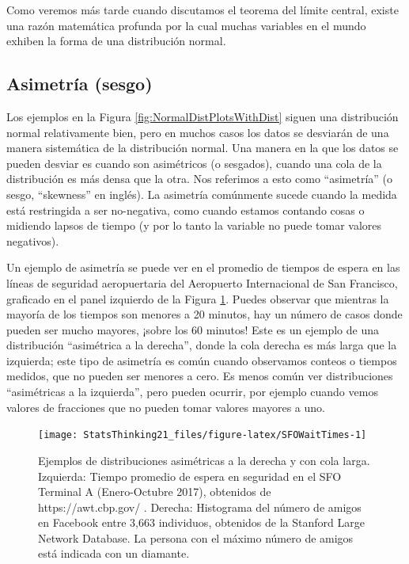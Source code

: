 \documentclass[
  12pt,
]{book}
\begin{document}
Como veremos más tarde cuando discutamos el teorema del límite central, existe una razón matemática profunda por la cual muchas variables en el mundo exhiben la forma de una distribución normal.

\hypertarget{asimetruxeda-sesgo}{%
\subsection{Asimetría (sesgo)}\label{asimetruxeda-sesgo}}

Los ejemplos en la Figura \ref{fig:NormalDistPlotsWithDist} siguen una distribución normal relativamente bien, pero en muchos casos los datos se desviarán de una manera sistemática de la distribución normal. Una manera en la que los datos se pueden desviar es cuando son asimétricos (o sesgados), cuando una cola de la distribución es más densa que la otra. Nos referimos a esto como ``asimetría'' (o sesgo, ``skewness'' en inglés). La asimetría comúnmente sucede cuando la medida está restringida a ser no-negativa, como cuando estamos contando cosas o midiendo lapsos de tiempo (y por lo tanto la variable no puede tomar valores negativos).

Un ejemplo de asimetría se puede ver en el promedio de tiempos de espera en las líneas de seguridad aeropuertaria del Aeropuerto Internacional de San Francisco, graficado en el panel izquierdo de la Figura \ref{fig:SFOWaitTimes}. Puedes observar que mientras la mayoría de los tiempos son menores a 20 minutos, hay un número de casos donde pueden ser mucho mayores, ¡sobre los 60 minutos! Este es un ejemplo de una distribución ``asimétrica a la derecha'', donde la cola derecha es más larga que la izquierda; este tipo de asimetría es común cuando observamos conteos o tiempos medidos, que no pueden ser menores a cero. Es menos común ver distribuciones ``asimétricas a la izquierda'', pero pueden ocurrir, por ejemplo cuando vemos valores de fracciones que no pueden tomar valores mayores a uno.

\begin{figure}
\texttt{[image: StatsThinking21\_files/figure-latex/SFOWaitTimes-1]} \caption{Ejemplos de distribuciones asimétricas a la derecha y con cola larga. Izquierda: Tiempo promedio de espera en seguridad en el SFO Terminal A (Enero-Octubre 2017), obtenidos de https://awt.cbp.gov/ . Derecha: Histograma del número de amigos en Facebook entre 3,663 individuos, obtenidos de la Stanford Large Network Database. La persona con el máximo número de amigos está indicada con un diamante.}\label{fig:SFOWaitTimes}
\end{figure}
\end{document}
